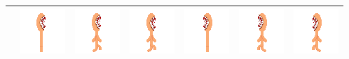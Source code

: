 \documentclass[../Main.tex]{subfiles}
\begin{document}
\begin{center}
\begin{tabular}{ | m{} | m{} m{} m{} m{} m{} m{} | }
                    & \centerline{\includegraphics[scale=3]{../res/textures/entities/enemies/fire/East.png}} & \centerline{\includegraphics[scale=3]{../res/textures/entities/enemies/fire/East-Walk-1.png}} & \centerline{\includegraphics[scale=3]{../res/textures/entities/enemies/fire/East-Walk-2.png}} & \centerline{\includegraphics[scale=3]{../res/textures/entities/enemies/fire/West.png}} & \centerline{\includegraphics[scale=3]{../res/textures/entities/enemies/fire/West-Walk-1.png}} & \centerline{\includegraphics[scale=3]{../res/textures/entities/enemies/fire/West-Walk-2.png}} \\
                    \hline

\end{tabular}
\end{center}
\end{document}
